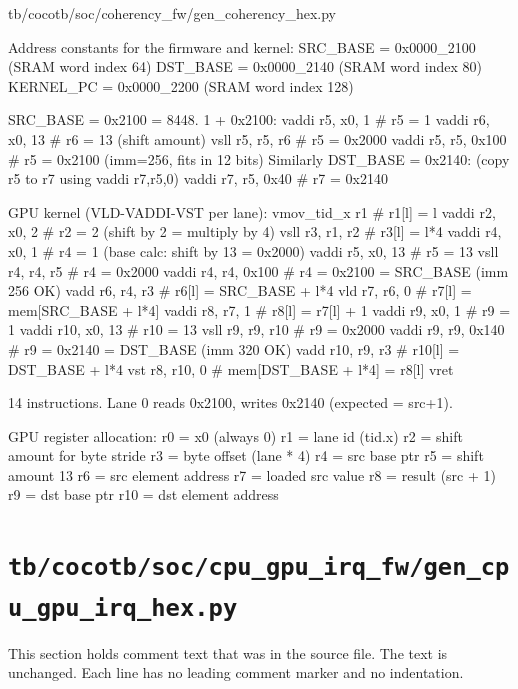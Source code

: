 \begin{relocated}{tb/cocotb/soc/coherency_fw/gen_coherency_hex.py}
\begin{textblock}
Address constants for the firmware and kernel:
SRC_BASE   = 0x0000_2100  (SRAM word index 64)
DST_BASE   = 0x0000_2140  (SRAM word index 80)
KERNEL_PC  = 0x0000_2200  (SRAM word index 128)

SRC_BASE = 0x2100 = 8448.  1 + 0x2100:
vaddi r5, x0, 1   # r5 = 1
vaddi r6, x0, 13  # r6 = 13 (shift amount)
vsll  r5, r5, r6  # r5 = 0x2000
vaddi r5, r5, 0x100  # r5 = 0x2100  (imm=256, fits in 12 bits)
Similarly DST_BASE = 0x2140:
(copy r5 to r7 using vaddi r7,r5,0)
vaddi r7, r5, 0x40   # r7 = 0x2140

GPU kernel (VLD-VADDI-VST per lane):
vmov_tid_x r1        # r1[l] = l
vaddi r2, x0, 2      # r2 = 2 (shift by 2 = multiply by 4)
vsll  r3, r1, r2     # r3[l] = l*4
vaddi r4, x0, 1      # r4 = 1 (base calc: shift by 13 = 0x2000)
vaddi r5, x0, 13     # r5 = 13
vsll  r4, r4, r5     # r4 = 0x2000
vaddi r4, r4, 0x100  # r4 = 0x2100 = SRC_BASE (imm 256 OK)
vadd  r6, r4, r3     # r6[l] = SRC_BASE + l*4
vld   r7, r6, 0      # r7[l] = mem[SRC_BASE + l*4]
vaddi r8, r7, 1      # r8[l] = r7[l] + 1
vaddi r9, x0, 1      # r9 = 1
vaddi r10, x0, 13    # r10 = 13
vsll  r9, r9, r10    # r9 = 0x2000
vaddi r9, r9, 0x140  # r9 = 0x2140 = DST_BASE (imm 320 OK)
vadd  r10, r9, r3    # r10[l] = DST_BASE + l*4
vst   r8, r10, 0     # mem[DST_BASE + l*4] = r8[l]
vret

14 instructions. Lane 0 reads 0x2100, writes 0x2140 (expected = src+1).

GPU register allocation:
r0  = x0 (always 0)
r1  = lane id (tid.x)
r2  = shift amount for byte stride
r3  = byte offset (lane * 4)
r4  = src base ptr
r5  = shift amount 13
r6  = src element address
r7  = loaded src value
r8  = result (src + 1)
r9  = dst base ptr
r10 = dst element address
\end{textblock}

\end{relocated}

\section{\texttt{tb/cocotb/soc/cpu\_gpu\_irq\_fw/gen\_cpu\_gpu\_irq\_hex.py}}\label{tm:suite:soc-cpu-gpu-irq-fw-gen-cpu-gpu-irq-hex}

This section holds comment text that was in the source file. The text is unchanged. Each line has no leading comment marker and no indentation.

